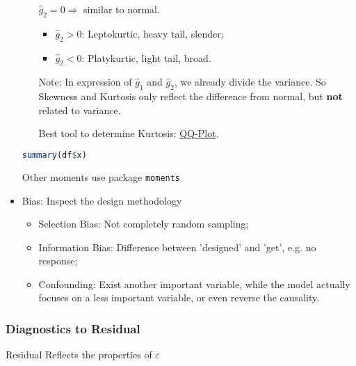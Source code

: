 \begin{itemize}[topsep=2pt,itemsep=2pt]
\begin{itemize}[topsep=2pt,itemsep=2pt]
            $ \hat{g}_2=0 \Rightarrow $ similar to normal.
            \begin{itemize}[topsep=2pt,itemsep=2pt]
                \item $ \hat{g}_2>0 $: Leptokurtic, heavy tail, slender;
                \item $ \hat{g}_2<0 $: Platykurtic, light tail, broad.
            \end{itemize}
            
            Note: In expression of $ \hat{g}_1 $ and $ \hat{g}_2 $, we already divide the variance. So Skewness and Kurtosis only reflect the difference from normal, but \textbf{not}  related to variance.
                
            Best tool to determine Kurtosis: \hyperlink{QQplot}{QQ-Plot}.
            
        \end{itemize}

\begin{rcode}
\begin{lstlisting}[language=R]
summary(df$x)
\end{lstlisting}

    Other moments use package \lstinline|moments|
\end{rcode}
        
    
        \item Bias: Inspect the design methodology
        \begin{itemize}[topsep=2pt,itemsep=2pt]
            \item Selection Bias: Not completely random sampling;
            \item Information Bias: Difference between 'designed' and 'get', e.g. no response;
            \item Confounding: Exist another important variable, while the model actually focuses on a less important variable, or even reverse the causality.
        \end{itemize}
        
            
\end{itemize}
    
\subsubsection{Diagnostics to Residual}\label{SubSecDiagnostics}

\begin{point}
    Residual Reflects the properties of $ \varepsilon  $
\end{point}


